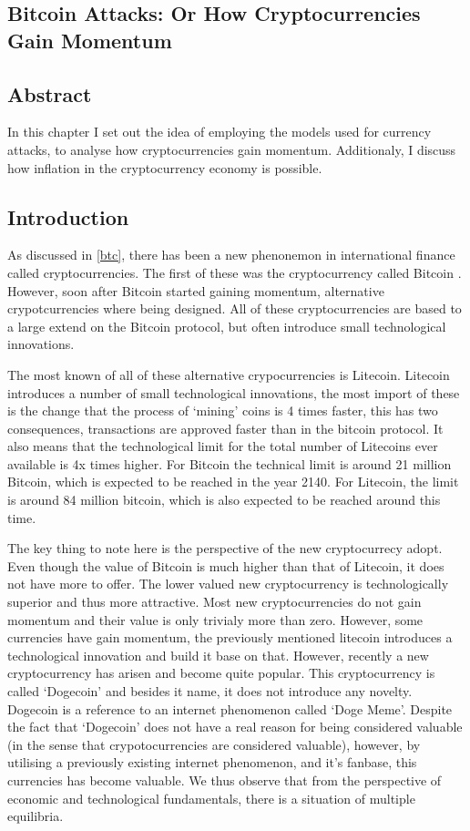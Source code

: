 \begin{refsection}
\chapter{Bitcoin Attacks: Or How Cryptocurrencies Gain Momentum}
\label{bitatt}
\section*{Abstract}
In this chapter I set out the idea of employing the models used for currency attacks,
to analyse how cryptocurrencies gain momentum.
Additionaly, I discuss how inflation in the cryptocurrency economy is possible.
\pagebreak

\section{Introduction}
As discussed in \autoref{btc}, there has been a new phenonemon in international finance called cryptocurrencies.
The first of these was the cryptocurrency called Bitcoin \parencite{nakamoto2008bitcoin}.
However, soon after Bitcoin started gaining momentum, alternative crypotcurrencies where being designed.
All of these cryptocurrencies are based to a large extend on the Bitcoin protocol,
but often introduce small technological innovations.

The most known of all of these alternative crypocurrencies is Litecoin. Litecoin introduces a number of small technological innovations,
the most import of these is the change that the process of `mining' coins is 4 times faster,
this has two consequences, transactions are approved faster than in the bitcoin protocol.
It also means that the technological limit for the total number of Litecoins ever available is 4x times higher.
For Bitcoin the technical limit is around 21 million Bitcoin, which is expected to be reached in the year 2140.
For Litecoin, the limit is around 84 million bitcoin, which is also expected to be reached around this time.

The key thing to note here is the perspective of the new cryptocurrecy adopt.
Even though the value of Bitcoin is much higher than that of Litecoin, it does not have more to offer.
The lower valued new cryptocurrency is technologically superior and thus more attractive.
Most new cryptocurrencies do not gain momentum and their value is only trivialy more than zero.
However, some currencies have gain momentum,
the previously mentioned litecoin introduces a technological innovation and build it base on that.
However, recently a new cryptocurrency has arisen and become quite popular.
This cryptocurrency is called `Dogecoin' and besides it name, it does not introduce any novelty.
Dogecoin is a reference to an internet phenomenon called `Doge Meme'.
Despite the fact that `Dogecoin' does not have a real reason for being considered valuable
(in the sense that crypotocurrencies are considered valuable),
however, by utilising a previously existing internet phenomenon, and it's fanbase, this currencies has become valuable.
We thus observe that from the perspective of economic and technological fundamentals,
there is a situation of multiple equilibria.


\end{refsection}
